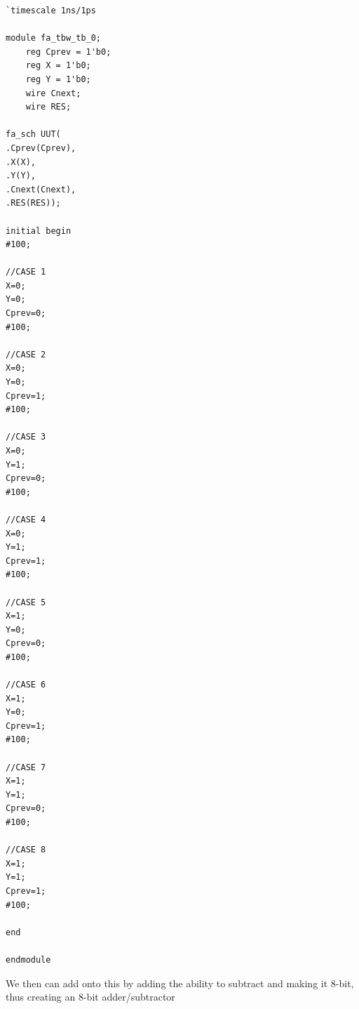 \documentclass[12pt]{article}
\begin{document}
		\begin{Verbatim}[frame=single, fontsize=\small]
`timescale 1ns/1ps

module fa_tbw_tb_0;
    reg Cprev = 1'b0;
    reg X = 1'b0;
    reg Y = 1'b0;
    wire Cnext;
    wire RES;

fa_sch UUT(
.Cprev(Cprev),
.X(X),
.Y(Y),
.Cnext(Cnext),
.RES(RES));

initial begin
#100;

//CASE 1
X=0;
Y=0;
Cprev=0;
#100;

//CASE 2
X=0;
Y=0;
Cprev=1;
#100;

//CASE 3
X=0;
Y=1;
Cprev=0;
#100;

//CASE 4
X=0;
Y=1;
Cprev=1;
#100;

//CASE 5
X=1;
Y=0;
Cprev=0;
#100;

//CASE 6
X=1;
Y=0;
Cprev=1;
#100;

//CASE 7
X=1;
Y=1;
Cprev=0;
#100;

//CASE 8
X=1;
Y=1;
Cprev=1;
#100;

end
	
endmodule
		\end{Verbatim}
		
		We then can add onto this by adding the ability to subtract and making it 8-bit, thus creating an 8-bit adder/subtractor
		
\end{document}
